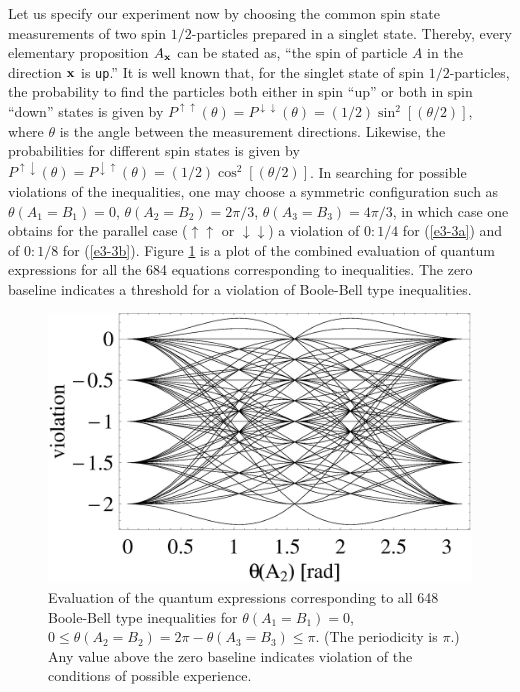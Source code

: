 Let us specify our experiment now by choosing
the common spin state measurements of two spin $1/2$-particles prepared in a singlet state.
Thereby, every elementary proposition $A_{\bf x}$ can be stated as,
``the spin of  particle $A$ in the direction $\bf x$ is {\tt up}.''
It is well known that, for the singlet state of spin $1/2$-particles, the probability
to find the particles  both either in spin ``up'' or both in spin ``down'' states
is given by
$
P^{\uparrow \uparrow} (\theta)=
P^{\downarrow \downarrow} (\theta)=
(1/2)\sin^2[(\theta /2)]
$, where $\theta$ is the angle between the measurement directions.
Likewise, the probabilities for different spin states is given by
$
P^{\uparrow \downarrow} (\theta)=
P^{\downarrow \uparrow} (\theta)=
(1/2)\cos^2[(\theta /2)]
$.
In searching for possible violations of the inequalities,
one may choose a symmetric configuration such as
$\theta(A_1 = B_1) = 0$,
$\theta(A_2 = B_2) = 2\pi / 3 $,
$\theta(A_3 = B_3) = 4\pi / 3 $,
in which case one obtains for the parallel case ($\uparrow \uparrow$ or $\downarrow \downarrow$) a violation
of
$0:1/4$ for (\ref{e3-3a}) and of
$0:1/8$ for (\ref{e3-3b}).
Figure \ref{2000-poly-f1} is a plot of the combined evaluation of quantum expressions
for all the 684 equations corresponding to inequalities.
The zero baseline indicates a threshold for a
violation of Boole-Bell type inequalities.
\begin{figure}
 \includegraphics[width=15cm]{2000-poly-f2.eps}
 \caption{Evaluation of the quantum expressions corresponding to all 648
Boole-Bell type inequalities for
$\theta(A_1 = B_1) = 0$,
$0\le \theta(A_2 = B_2) =2\pi -\theta(A_3 = B_3) \le  \pi$. (The periodicity is $\pi$.)
Any value above the zero baseline indicates violation of the conditions
of possible experience.}
\label{2000-poly-f1}
\end{figure}
